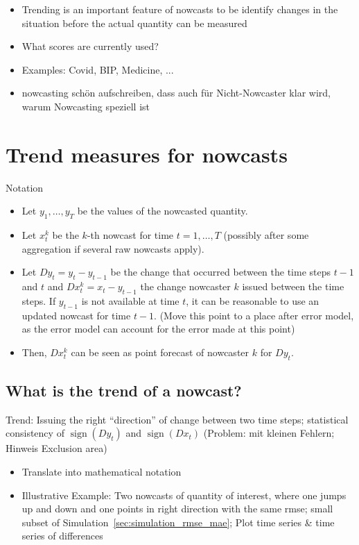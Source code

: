 \documentclass[oneside]{article}
\theoremstyle{plain}%
\theoremstyle{definition}
\DeclareMathOperator{\sign}{sign}
\newcommand{\ydiff}{D y}
\newcommand{\xdiff}{Dx}
\begin{document}
\begin{itemize}
	\item Trending is an important feature of nowcasts to be identify changes in the situation before the actual quantity can be measured
	\item What scores are currently used?
	\item Examples: Covid, BIP, Medicine, ... 
 \item nowcasting schön aufschreiben, dass auch für Nicht-Nowcaster klar wird, warum Nowcasting speziell ist
\end{itemize}


\section{Trend measures for nowcasts}

Notation
\begin{itemize}
  \item Let $y_1, \ldots, y_T$ be the values of the nowcasted quantity.
  \item Let $x_t^k$ be the $k$-th nowcast for time $t = 1, \ldots, T$ (possibly after some aggregation if several raw nowcasts apply).
  \item Let $\ydiff_t = y_t - y_{t-1}$ be the change that occurred between the time steps $t-1$ and $t$ and $\xdiff_t^k = x_t - y_{t-1}$ the change nowcaster $k$ issued between the time steps. If $y_{t-1}$ is not available at time $t$, it can be reasonable to use an updated nowcast for time $t-1$. (Move this point to a place after error model, as the error model can account for the error made at this point) 
  \item Then, $\xdiff_t^k$ can be seen as point forecast of nowcaster $k$ for $\ydiff_t$. 
\end{itemize}

\subsection{What is the trend of a nowcast?}

Trend: Issuing the right \enquote{direction} of change between two time steps; statistical consistency of $\sign(\ydiff_t)$ and $\sign(\xdiff_t)$ (Problem: mit kleinen Fehlern; Hinweis Exclusion area)

\begin{itemize}
  \item Translate into mathematical notation
  \item Illustrative Example: Two nowcasts of quantity of interest, where one jumps up and down and one points in right direction with the same rmse; small subset of Simulation~\ref{sec:simulation_rmse_mae}; Plot time series \& time series of differences
\end{itemize}
\end{document}
